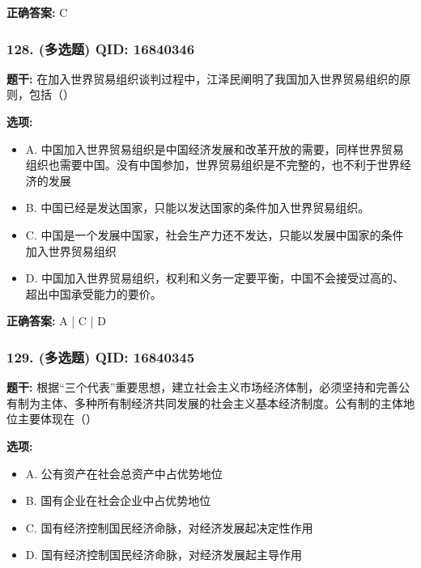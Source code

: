\documentclass[12pt,UTF8]{ctexart}
\begin{document}
\textbf{正确答案:}
C

\vspace{0.3em}\hrulefill\vspace{0.7em}

\subsubsection*{128. (多选题) \small QID: 16840346}

\textbf{题干:}
在加入世界贸易组织谈判过程中，江泽民阐明了我国加入世界贸易组织的原则，包括（）

\textbf{选项:}
\begin{itemize}[leftmargin=*]

  \item A. 中国加入世界贸易组织是中国经济发展和改革开放的需要，同样世界贸易组织也需要中国。没有中国参加，世界贸易组织是不完整的，也不利于世界经济的发展

  \item B. 中国已经是发达国家，只能以发达国家的条件加入世界贸易组织。

  \item C. 中国是一个发展中国家，社会生产力还不发达，只能以发展中国家的条件加入世界贸易组织

  \item D. 中国加入世界贸易组织，权利和义务一定要平衡，中国不会接受过高的、超出中国承受能力的要价。

\end{itemize}

\textbf{正确答案:}
A | C | D

\vspace{0.3em}\hrulefill\vspace{0.7em}

\subsubsection*{129. (多选题) \small QID: 16840345}

\textbf{题干:}
根据“三个代表”重要思想，建立社会主义市场经济体制，必须坚持和完善公有制为主体、多种所有制经济共同发展的社会主义基本经济制度。公有制的主体地位主要体现在（）

\textbf{选项:}
\begin{itemize}[leftmargin=*]

  \item A. 公有资产在社会总资产中占优势地位

  \item B. 国有企业在社会企业中占优势地位

  \item C. 国有经济控制国民经济命脉，对经济发展起决定性作用

  \item D. 国有经济控制国民经济命脉，对经济发展起主导作用

\end{itemize}
\end{document}
